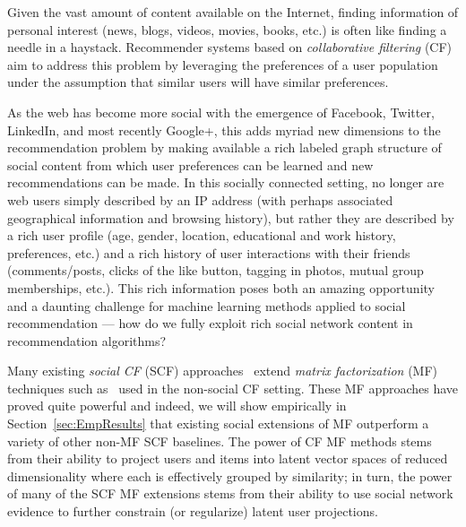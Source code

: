 Given the vast amount of content available on the Internet, finding
information of personal interest (news, blogs, videos, movies, books,
etc.) is often like finding a needle in a haystack.  Recommender
systems based on \emph{collaborative filtering}
(CF)~\cite{collab_filtering} aim to address this problem by leveraging
the preferences of a user population under the assumption that similar
users will have similar preferences.

As the web has become more social with the emergence of Facebook,
Twitter, LinkedIn, and most recently Google+, this adds myriad new
dimensions to the recommendation problem by making available a rich
labeled graph structure of social content from which user preferences
can be learned and new recommendations can be made.  In this socially
connected setting, no longer are web users simply described by an IP
address (with perhaps associated geographical information and browsing
history), but rather they are described by a rich user profile (age,
gender, location, educational and work history, preferences, etc.)
and a rich history of user interactions with their friends (comments/posts, 
clicks of the like button, tagging in photos, mutual group
memberships, etc.).  This rich information poses both an amazing
opportunity and a daunting challenge for machine learning methods
applied to social recommendation --- how do we fully exploit rich social
network content in recommendation algorithms?

Many existing \emph{social CF} (SCF)
approaches~\cite{ste,sorec,lla,socinf,sr,rrmf} extend \emph{matrix
factorization} (MF) techniques such as~\cite{pmf} used in the
non-social CF setting.  These MF approaches have proved quite powerful
and indeed, we will show empirically in Section~\ref{sec:EmpResults} 
that existing social extensions of MF outperform a variety of other
non-MF SCF baselines.  The power of CF MF methods stems from their
ability to project users and items into latent vector spaces of
reduced dimensionality where each is effectively grouped by
similarity; in turn, the power of many of the SCF MF extensions stems
from their ability to use social network evidence to further constrain
(or regularize) latent user projections.

